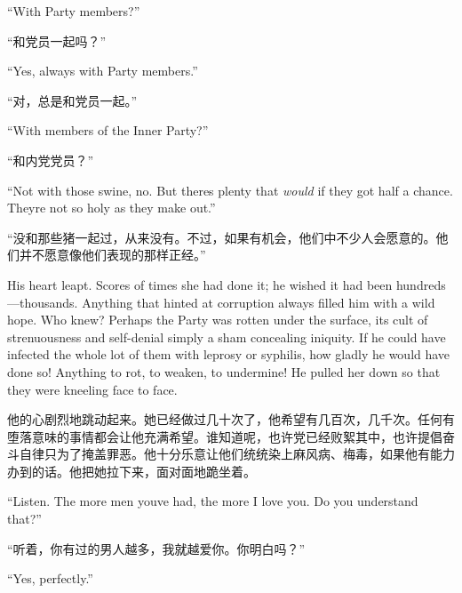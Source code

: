 \begin{paracol}{2}
\switchcolumn*

``With Party members?''

\switchcolumn

``和党员一起吗？''

\switchcolumn*

``Yes, always with Party members.''

\switchcolumn

``对，总是和党员一起。''

\switchcolumn*

``With members of the Inner Party?''

\switchcolumn

``和内党党员？''

\switchcolumn*

``Not with those swine, no. But there\textquotesingle s plenty that
\emph{would} if they got half a chance. They\textquotesingle re not so
holy as they make out.''

\switchcolumn

``没和那些猪一起过，从来没有。不过，如果有机会，他们中不少人会愿意的。他们并不愿意像他们表现的那样正经。''

\switchcolumn*

His heart leapt. Scores of times she had done it; he wished it had been
hundreds---thousands. Anything that hinted at corruption always filled
him with a wild hope. Who knew? Perhaps the Party was rotten under the
surface, its cult of strenuousness and self-denial simply a sham
concealing iniquity. If he could have infected the whole lot of them
with leprosy or syphilis, how gladly he would have done so! Anything to
rot, to weaken, to undermine! He pulled her down so that they were
kneeling face to face.

\switchcolumn

他的心剧烈地跳动起来。她已经做过几十次了，他希望有几百次，几千次。任何有堕落意味的事情都会让他充满希望。谁知道呢，也许党已经败絮其中，也许提倡奋斗自律只为了掩盖罪恶。他十分乐意让他们统统染上麻风病、梅毒，如果他有能力办到的话。他把她拉下来，面对面地跪坐着。

\switchcolumn*

``Listen. The more men you\textquotesingle ve had, the more I love you.
Do you understand that?''

\switchcolumn

``听着，你有过的男人越多，我就越爱你。你明白吗？''

\switchcolumn*

``Yes, perfectly.''


\end{paracol}
